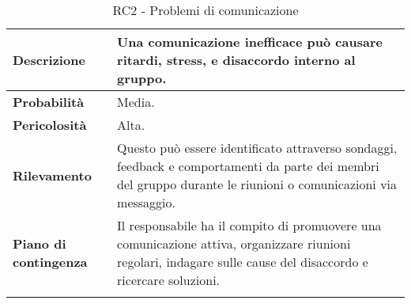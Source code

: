 \newpage

\begin{longtable}{|l|p{10cm}|}
    \hline
    \textbf{Descrizione} & Una comunicazione inefficace può causare ritardi, stress, e disaccordo interno al gruppo. \\ 
    \hline
    \textbf{Probabilità} & Media. \\
    \hline
    \textbf{Pericolosità} & Alta. \\
    \hline
    \textbf{Rilevamento} & Questo può essere identificato attraverso sondaggi, feedback e comportamenti da parte dei membri del gruppo durante le riunioni o comunicazioni via messaggio. \\
    \hline
    \textbf{Piano di contingenza} & Il responsabile ha il compito di promuovere una comunicazione attiva, organizzare riunioni regolari, indagare sulle cause del disaccordo e ricercare soluzioni. \\
    \hline
    \caption{RC2 - Problemi di comunicazione}
    \label{table:9}
\end{longtable}